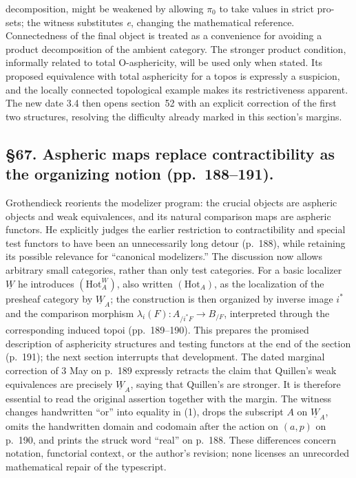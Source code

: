 \documentclass[10pt,oneside]{book}
\begin{document}
decomposition, might be weakened by allowing $\pi_0$ to take values in strict pro-sets; the witness substitutes \emph{e}, changing the mathematical reference. Connectedness of the final object is treated as a convenience for avoiding a product decomposition of the ambient category. The stronger product condition, informally related to total O-asphericity, will be used only when stated. Its proposed equivalence with total asphericity for a topos is expressly a suspicion, and the locally connected topological example makes its restrictiveness apparent. The new date 3.4 then opens section~52 with an explicit correction of the first two structures, resolving the difficulty already marked in this section's margins.

\subsection*{\S67. Aspheric maps replace contractibility as the organizing notion (pp.\ 188--191).}
Grothendieck reorients the modelizer program: the crucial objects are aspheric objects and weak equivalences, and its natural comparison maps are aspheric functors. He explicitly judges the earlier restriction to contractibility and special test functors to have been an unnecessarily long detour (p.\ 188), while retaining its possible relevance for ``canonical modelizers.'' The discussion now allows arbitrary small categories, rather than only test categories. For a basic localizer $\underline W$ he introduces $(\mathrm{Hot}^{W}_{A})$, also written $(\mathrm{Hot}_{A})$, as the localization of the presheaf category by $\underline W_A$; the construction is then organized by inverse image $i^*$ and the comparison morphism $\lambda_i(F):A_{/i^*F}\longrightarrow B_{/F}$, interpreted through the corresponding induced topoi (pp.\ 189--190). This prepares the promised description of asphericity structures and testing functors at the end of the section (p.\ 191); the next section interrupts that development. The dated marginal correction of 3 May on p.\ 189 expressly retracts the claim that Quillen's weak equivalences are precisely $\underline W_A$, saying that Quillen's are stronger. It is therefore essential to read the original assertion together with the margin. The witness changes handwritten ``or'' into equality in (1), drops the subscript $A$ on $\underline W_A$, omits the handwritten domain and codomain after the action on $(a,p)$ on p.\ 190, and prints the struck word ``real'' on p.\ 188. These differences concern notation, functorial context, or the author's revision; none licenses an unrecorded mathematical repair of the typescript.
\end{document}
